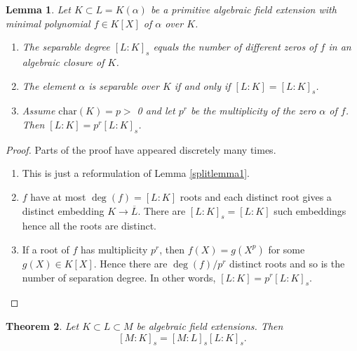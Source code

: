 \documentclass[12pt]{report}
\newtheorem{thm}{Theorem}[section]
\newtheorem{lemma}[thm]{Lemma}
\theoremstyle{definition}
\def\aa{\alpha}
\def\char{\text{char}}
\begin{document}
\begin{lemma}\label{seplem1}
    Let $K \subset L = K(\aa)$ be a primitive algebraic field extension with minimal polynomial $f \in K[X]$ of $\aa$ over $K$.
    \begin{enumerate}
        \item The separable degree $[L : K]_s$ equals the number of different zeros of $f$ in an algebraic closure of $K$.
        \item The element $\aa$ is separable over $K$ if and only if $[L : K] = [L : K]_s$.
        \item Assume $\char(K) = p >$ 0 and let $p^r$ be the multiplicity of the zero $\aa$ of $f$. Then $[L:K] =  p^r [L:K]_s$.
    \end{enumerate}
\end{lemma}

\begin{proof}
    Parts of the proof have appeared discretely many times.
    \begin{enumerate}
        \item This is just a reformulation of Lemma \ref{splitlemma1}.
        \item $f$ have at most $\deg(f)=[L:K]$ roots and each distinct root gives a distinct embedding $K\to \overline{L}$. There are $[L : K]_s=[L : K]$ such embeddings hence all the roots are distinct.
        \item If a root of $f$ has multiplicity $p^r$, then $f(X)=g(X^p)$ for some $g(X)\in K[X]$. Hence there are $\deg(f)/p^r$ distinct roots and so is the number of separation degree. In other words, $[L:K] =  p^r [L:K]_s$.
    \end{enumerate}
\end{proof}

\begin{thm}
    Let $K \subset L \subset M$ be algebraic field extensions. Then
    $$[M : K]_s = [M : L]_s [L : K]_s.$$
\end{thm}
\end{document}
